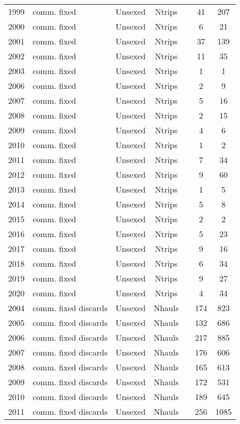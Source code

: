 \begin{longtable}[t]{c>{\centering\arraybackslash}p{3cm}ccccc}
1999 & comm. fixed & Unsexed & Ntrips &  & 41 & 207\\
2000 & comm. fixed & Unsexed & Ntrips &  & 6 & 21\\
2001 & comm. fixed & Unsexed & Ntrips &  & 37 & 139\\
2002 & comm. fixed & Unsexed & Ntrips &  & 11 & 35\\
2003 & comm. fixed & Unsexed & Ntrips &  & 1 & 1\\
2006 & comm. fixed & Unsexed & Ntrips &  & 2 & 9\\
2007 & comm. fixed & Unsexed & Ntrips &  & 5 & 16\\
2008 & comm. fixed & Unsexed & Ntrips &  & 2 & 15\\
2009 & comm. fixed & Unsexed & Ntrips &  & 4 & 6\\
2010 & comm. fixed & Unsexed & Ntrips &  & 1 & 2\\
2011 & comm. fixed & Unsexed & Ntrips &  & 7 & 34\\
2012 & comm. fixed & Unsexed & Ntrips &  & 9 & 60\\
2013 & comm. fixed & Unsexed & Ntrips &  & 1 & 5\\
2014 & comm. fixed & Unsexed & Ntrips &  & 5 & 8\\
2015 & comm. fixed & Unsexed & Ntrips &  & 2 & 2\\
2016 & comm. fixed & Unsexed & Ntrips &  & 5 & 23\\
2017 & comm. fixed & Unsexed & Ntrips &  & 9 & 16\\
2018 & comm. fixed & Unsexed & Ntrips &  & 6 & 34\\
2019 & comm. fixed & Unsexed & Ntrips &  & 9 & 27\\
2020 & comm. fixed & Unsexed & Ntrips &  & 4 & 34\\
2004 & comm. fixed discards & Unsexed & Nhauls &  & 174 & 823\\
2005 & comm. fixed discards & Unsexed & Nhauls &  & 132 & 686\\
2006 & comm. fixed discards & Unsexed & Nhauls &  & 217 & 885\\
2007 & comm. fixed discards & Unsexed & Nhauls &  & 176 & 606\\
2008 & comm. fixed discards & Unsexed & Nhauls &  & 165 & 613\\
2009 & comm. fixed discards & Unsexed & Nhauls &  & 172 & 531\\
2010 & comm. fixed discards & Unsexed & Nhauls &  & 189 & 645\\
2011 & comm. fixed discards & Unsexed & Nhauls &  & 256 & 1085\\

\end{longtable}
